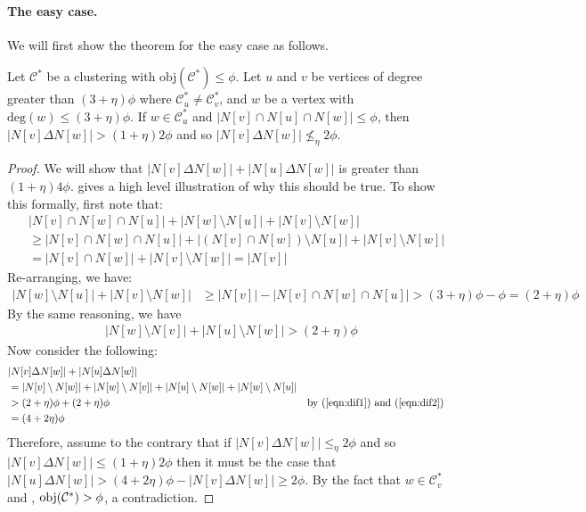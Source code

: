 \paragraph{The easy case.} We will first show the theorem for the easy case as follows. 
\begin{lemma}\label{lem:nostealingeasy}
Let $\mathcal{C}^\ast$ be a clustering with $\text{obj}(\mathcal{C}^{*}) \le \phi.$ Let $u$ and $v$ be vertices of degree greater than $(3+\eta)\phi$ where $\mathcal{C}^{*}_u \neq \mathcal{C}^{*}_v$, and $w$ be a vertex with $\text{deg}(w) \leq (3+\eta)\phi$. If $w \in \mathcal{C}^{*}_u$ and $|N[v] \cap N[u] \cap N[w]| \leq \phi$, then $|N[v] \Delta N[w]| > (1+\eta)2\phi$ and so $|N[v] \Delta N[w]| \nleq_{\eta} 2\phi$.
\end{lemma}
\begin{proof} We will show that $|N[v] \Delta N[w]| + |N[u] \Delta N[w]|$ is greater than $(1+\eta)4\phi$.  gives a high level illustration of why this should be true. To show this formally, first note that: 
\begin{align*}
&|N[v] \cap N[w] \cap N[u]| + |N[w] \setminus N[u]| + |N[v] \setminus N[w]| \\
&\geq |N[v] \cap N[w] \cap N[u]| + |(N[v] \cap N[w]) \setminus N[u]| + |N[v] \setminus N[w]| \\
&= |N[v] \cap N[w] |+ |N[v] \setminus N[w]| = |N[v]|
\end{align*}
Re-arranging, we have:
\begin{align}
|N[w] \setminus N[u]| + |N[v] \setminus N[w]| &\geq |N[v]| - |N[v] \cap N[w] \cap N[u]| > (3+\eta)\phi - \phi = (2+\eta)\phi \label{eqn:dif1}
\end{align}
By the same reasoning, we have
\begin{align}
|N[w] \setminus N[v]| + |N[u] \setminus N[w]| > (2+\eta)\phi \label{eqn:dif2}
\end{align}
Now consider the following:
\begin{align*}
&|N[v] \Delta N[w]| + |N[u] \Delta N[w]| \\
&= |N[v] \setminus N[w]| + |N[w] \setminus N[v]| + |N[u] \setminus N[w]| + |N[w] \setminus N[u]| \\
&> (2+\eta)\phi + (2+\eta)\phi && \mbox{by (\ref{eqn:dif1}) and (\ref{eqn:dif2})} \\
&= (4+2\eta)\phi
\end{align*}
Therefore, assume to the contrary that if $|N[v] \Delta N[w]| \leq_{\eta} 2\phi$ and so $|N[v] \Delta N[w]| \leq (1+\eta)2\phi$ then it must be the case that $|N[u] \Delta N[w]| > (4+2\eta)\phi - |N[v] \Delta N[w]| \geq 2\phi$. By the fact that $w \in \mathcal{C}^{*}_v$ and , $\mathrm{obj}(\mathcal{C}^{*}) > \phi$, a contradiction.
\end{proof}

